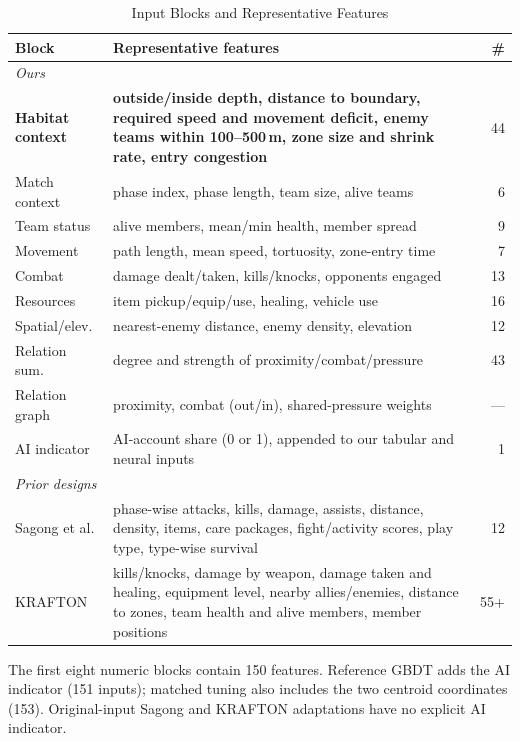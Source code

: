 \documentclass[sigconf,anonymous,nonacm]{acmart}
\begin{document}
\begin{table}[t]
\centering
\caption{Input Blocks and Representative Features}
\label{tab:blocks}
\footnotesize
\setlength{\tabcolsep}{3pt}
\begin{tabular}{p{1.45cm}p{5.8cm}r}
\hline
Block & Representative features & \# \\
\hline
\multicolumn{3}{l}{\emph{Ours}} \\
\textbf{Habitat context} & \textbf{outside/inside depth, distance to boundary, required speed and movement deficit, enemy teams within 100--500\,m, zone size and shrink rate, entry congestion} & 44 \\
Match context & phase index, phase length, team size, alive teams & 6 \\
Team status & alive members, mean/min health, member spread & 9 \\
Movement & path length, mean speed, tortuosity, zone-entry time & 7 \\
Combat & damage dealt/taken, kills/knocks, opponents engaged & 13 \\
Resources & item pickup/equip/use, healing, vehicle use & 16 \\
Spatial/elev. & nearest-enemy distance, enemy density, elevation & 12 \\
Relation sum. & degree and strength of proximity/combat/pressure & 43 \\
Relation graph & proximity, combat (out/in), shared-pressure weights & --- \\
AI indicator & AI-account share (0 or 1), appended to our tabular and neural inputs & 1 \\
\hline
\multicolumn{3}{l}{\emph{Prior designs}} \\
Sagong et al. & phase-wise attacks, kills, damage, assists, distance, density, items, care packages, fight/activity scores, play type, type-wise survival & 12 \\
KRAFTON & kills/knocks, damage by weapon, damage taken and healing, equipment level, nearby allies/enemies, distance to zones, team health and alive members, member positions & 55+ \\
\hline
\end{tabular}
\smallskip
\parbox{\columnwidth}{\scriptsize The first eight numeric blocks contain 150 features. Reference GBDT adds the AI indicator (151 inputs); matched tuning also includes the two centroid coordinates (153). Original-input Sagong and KRAFTON adaptations have no explicit AI indicator.}
\end{table}
\end{document}
